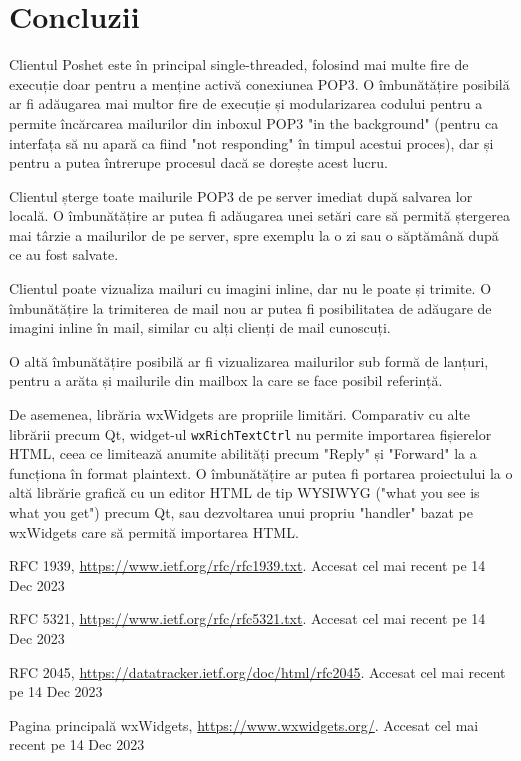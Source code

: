 \documentclass[runningheads]{llncs}
\begin{document}
\newpage

\section{Concluzii}

Clientul Poshet este în principal single-threaded, folosind mai multe fire de execuție doar pentru a menține activă conexiunea POP3. O îmbunătățire posibilă ar fi adăugarea mai multor fire de execuție și modularizarea codului pentru a permite încărcarea mailurilor din inboxul POP3 "in the background" (pentru ca interfața să nu apară ca fiind "not responding" în timpul acestui proces), dar și pentru a putea întrerupe procesul dacă se dorește acest lucru.

Clientul șterge toate mailurile POP3 de pe server imediat după salvarea lor locală. O îmbunătățire ar putea fi adăugarea unei setări care să permită ștergerea mai târzie a mailurilor de pe server, spre exemplu la o zi sau o săptămână după ce au fost salvate.

Clientul poate vizualiza mailuri cu imagini inline, dar nu le poate și trimite. O îmbunătățire la trimiterea de mail nou ar putea fi posibilitatea de adăugare de imagini inline în mail, similar cu alți clienți de mail cunoscuți.

O altă îmbunătățire posibilă ar fi vizualizarea mailurilor sub formă de lanțuri, pentru a arăta și mailurile din mailbox la care se face posibil referință.

De asemenea, librăria wxWidgets are propriile limitări. Comparativ cu alte librării precum Qt, widget-ul \texttt{wxRichTextCtrl} nu permite importarea fișierelor HTML, ceea ce limitează anumite abilități precum "Reply" și "Forward" la a funcționa în format plaintext. O îmbunătățire ar putea fi portarea proiectului la o altă librărie grafică cu un editor HTML de tip WYSIWYG ("what you see is what you get") precum Qt, sau dezvoltarea unui propriu "handler" bazat pe wxWidgets care să permită importarea HTML.
%
%
%
% 
% 

\begin{thebibliography}{8}
RFC 1939, \url{https://www.ietf.org/rfc/rfc1939.txt}. Accesat cel mai recent pe 14 Dec 2023

RFC 5321, \url{https://www.ietf.org/rfc/rfc5321.txt}. Accesat cel mai recent pe 14 Dec 2023

RFC 2045, \url{https://datatracker.ietf.org/doc/html/rfc2045}. Accesat cel mai recent pe 14 Dec 2023

Pagina principală wxWidgets, \url{https://www.wxwidgets.org/}. Accesat cel mai recent pe 14 Dec 2023


\end{thebibliography}
\end{document}
